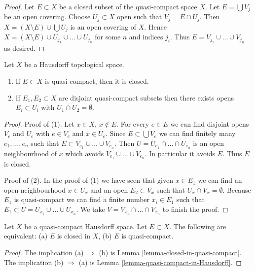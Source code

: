 \begin{proof}
Let $E \subset X$ be a closed subset of the quasi-compact space $X$.
Let $E = \bigcup V_j$ be an open covering. Choose $U_j \subset X$
open such that $V_j = E \cap U_j$. Then $X = (X \setminus E) \cup \bigcup U_j$
is an open covering of $X$. Hence
$X = (X \setminus E) \cup U_{j_1} \cup \ldots \cup U_{j_n}$ for some
$n$ and indices $j_i$. Thus $E = V_{j_1} \cup \ldots \cup V_{j_n}$
as desired.
\end{proof}

\begin{lemma}
\label{lemma-quasi-compact-in-Hausdorff}
Let $X$ be a Hausdorff topological space.
\begin{enumerate}
\item If $E \subset X$ is quasi-compact, then it is closed.
\item If $E_1, E_2 \subset X$ are disjoint quasi-compact subsets
then there exists opens $E_i \subset U_i$ with $U_1 \cap U_2 = \emptyset$.
\end{enumerate}
\end{lemma}

\begin{proof}
Proof of (1). Let $x \in X$, $x \not \in E$.
For every $e \in E$ we can find disjoint opens $V_e$ and $U_e$
with $e \in V_e$ and $x \in U_e$. Since $E \subset \bigcup V_e$
we can find finitely many $e_1, \ldots, e_n$ such that
$E \subset V_{e_1} \cup \ldots \cup V_{e_n}$. Then
$U = U_{e_1} \cap \ldots \cap U_{e_n}$ is an open neighbourhood
of $x$ which avoids $V_{e_1} \cup \ldots \cup V_{e_n}$. In particular
it avoids $E$. Thus $E$ is closed.

\medskip\noindent
Proof of (2). In the proof of (1) we have seen that given $x \in E_1$
we can find an open neighbourhood $x \in U_x$ and an open
$E_2 \subset V_x$ such that $U_x \cap V_x = \emptyset$. Because
$E_1$ is quasi-compact we can find a finite number $x_i \in E_1$
such that $E_1 \subset U = U_{x_1} \cup \ldots \cup U_{x_n}$.
We take $V = V_{x_1} \cap \ldots \cap V_{x_n}$ to finish the proof.
\end{proof}

\begin{lemma}
\label{lemma-closed-in-compact}
Let $X$ be a quasi-compact Hausdorff space. Let $E \subset X$.
The following are equivalent: (a) $E$ is closed in $X$, (b)
$E$ is quasi-compact.
\end{lemma}

\begin{proof}
The implication (a) $\Rightarrow$ (b) is
Lemma \ref{lemma-closed-in-quasi-compact}.
The implication (b) $\Rightarrow$ (a) is
Lemma \ref{lemma-quasi-compact-in-Hausdorff}.
\end{proof}

